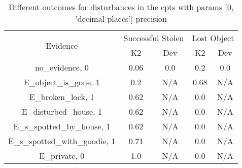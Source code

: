 \begin{table}\begin{tabular}{c|cc|cc}\toprule\multirow{2}{*}{Evidence} & \multicolumn{2}{c}{Successful Stolen} & \multicolumn{2}{c}{Lost Object} \\& {K2} & {Dev} & {K2} & {Dev} \\\midrule
no\_evidence, 0 & \cellcolor{Bittersweet}0.06&\cellcolor{Bittersweet}0.0&\cellcolor{Bittersweet}0.2&\cellcolor{Bittersweet}0.0\\E\_object\_is\_gone, 1 & \cellcolor{Bittersweet}0.2&\cellcolor{Bittersweet}N/A&\cellcolor{Bittersweet}0.68&\cellcolor{Bittersweet}N/A\\E\_broken\_lock, 1 & \cellcolor{Bittersweet}0.62&\cellcolor{Bittersweet}N/A&\cellcolor{Bittersweet}0.0&\cellcolor{Bittersweet}N/A\\E\_disturbed\_house, 1 & \cellcolor{Bittersweet}0.62&\cellcolor{Bittersweet}N/A&\cellcolor{Bittersweet}0.0&\cellcolor{Bittersweet}N/A\\E\_s\_spotted\_by\_house, 1 & \cellcolor{Bittersweet}0.62&\cellcolor{Bittersweet}N/A&\cellcolor{Bittersweet}0.0&\cellcolor{Bittersweet}N/A\\E\_s\_spotted\_with\_goodie, 1 & \cellcolor{Bittersweet}0.71&\cellcolor{Bittersweet}N/A&\cellcolor{Bittersweet}0.0&\cellcolor{Bittersweet}N/A\\E\_private, 0 & \cellcolor{Bittersweet}1.0&\cellcolor{Bittersweet}N/A&\cellcolor{Bittersweet}0.0&\cellcolor{Bittersweet}N/A\\\bottomrule\end{tabular}\caption{Different outcomes for disturbances in the cpts with params [0, 'decimal places'] precision}\end{table}